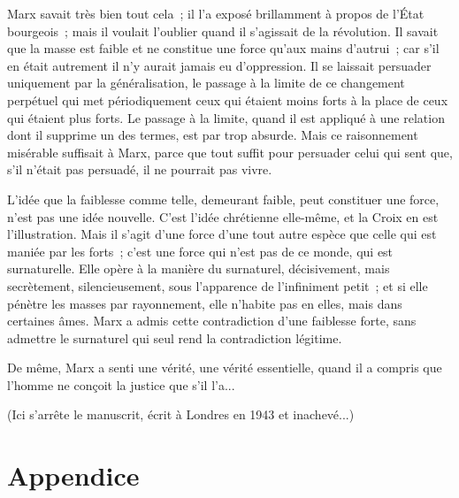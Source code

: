 \documentclass[french,twoside]{book} %
\begin{document}
Marx savait très bien tout cela ; il l'a exposé brillamment à propos de l'État bourgeois ; mais il voulait l'oublier quand il s'agissait de la révolution. Il savait que la masse est faible et ne constitue une force qu'aux mains d'autrui ; car s'il en était autrement il n'y aurait jamais eu d'oppression. Il se laissait persuader uniquement par la généralisation, le passage à la limite de ce changement perpétuel qui met périodiquement ceux qui étaient moins forts à la place de ceux qui étaient plus forts. Le passage à la limite, quand il est appliqué à une relation dont il supprime un des termes, est par trop absurde. Mais ce raisonnement misérable suffisait à Marx, parce que tout suffit pour persuader celui qui sent que, s'il n'était pas persuadé, il ne pourrait pas vivre.\par
L'idée que la faiblesse comme telle, demeurant faible, peut constituer une force, n'est pas une idée nouvelle. C'est l'idée chrétienne elle-même, et la Croix en est l'illustration. Mais il s'agit d'une force d'une tout autre espèce que celle qui est maniée par les forts ; c'est une force qui n'est pas de ce monde, qui est surnaturelle. Elle opère à la manière du surnaturel, décisivement, mais secrètement, silencieusement, sous l'apparence de l'infiniment petit ; et si elle pénètre les masses par rayonnement, elle n'habite pas en elles, mais dans certaines âmes. Marx a admis cette contradiction d'une faiblesse forte, sans admettre le surnaturel qui seul rend la contradiction légitime.\par
De même, Marx a senti une vérité, une vérité essentielle, quand il a compris que l'homme ne conçoit la justice que s'il l'a...\par
(Ici s'arrête le manuscrit, écrit à Londres en 1943 et inachevé...)\par

\begin{center}
\noindent \centerline{}
\end{center}

\backmatter \section[{Appendice }]{Appendice \protect\footnotemark }\renewcommand{\leftmark}{Appendice }

\noindent \par
\end{document}

